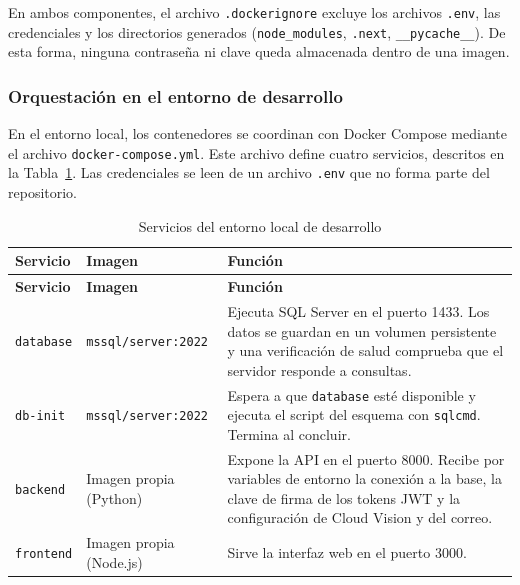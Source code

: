 En ambos componentes, el archivo \texttt{.dockerignore} excluye los archivos \texttt{.env}, las credenciales y los directorios generados (\texttt{node\_modules}, \texttt{.next}, \texttt{\_\_pycache\_\_}). De esta forma, ninguna contraseña ni clave queda almacenada dentro de una imagen.

\subsubsection{Orquestación en el entorno de desarrollo}

En el entorno local, los contenedores se coordinan con Docker Compose mediante el archivo \texttt{docker-compose.yml}. Este archivo define cuatro servicios, descritos en la Tabla~\ref{tab:servicios_locales}. Las credenciales se leen de un archivo \texttt{.env} que no forma parte del repositorio.

\begin{longtable}{|p{2.6cm}|p{4.4cm}|p{6.6cm}|}
\caption{Servicios del entorno local de desarrollo}
\label{tab:servicios_locales} \\

\hline
\textbf{Servicio} & \textbf{Imagen} & \textbf{Función} \\
\hline
\endfirsthead

\hline
\textbf{Servicio} & \textbf{Imagen} & \textbf{Función} \\
\hline
\endhead

\texttt{database} & \texttt{mssql/server:2022} & Ejecuta SQL Server en el puerto 1433. Los datos se guardan en un volumen persistente y una verificación de salud comprueba que el servidor responde a consultas. \\
\hline
\texttt{db-init} & \texttt{mssql/server:2022} & Espera a que \texttt{database} esté disponible y ejecuta el script del esquema con \texttt{sqlcmd}. Termina al concluir. \\
\hline
\texttt{backend} & Imagen propia (Python) & Expone la API en el puerto 8000. Recibe por variables de entorno la conexión a la base, la clave de firma de los tokens JWT y la configuración de Cloud Vision y del correo. \\
\hline
\texttt{frontend} & Imagen propia (Node.js) & Sirve la interfaz web en el puerto 3000. \\
\hline

\end{longtable}

